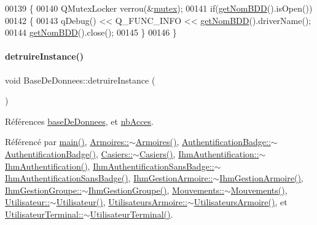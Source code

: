 \begin{DoxyCode}
00139 \{
00140     QMutexLocker verrou(&\hyperlink{class_base_de_donnees_aa1b4696fac87a740f914aa73739086f2}{mutex});
00141     \textcolor{keywordflow}{if}(\hyperlink{class_base_de_donnees_a467909531ae3cdebaf173f6e97cdc624}{getNomBDD}().isOpen())
00142     \{
00143         qDebug() << Q\_FUNC\_INFO << \hyperlink{class_base_de_donnees_a467909531ae3cdebaf173f6e97cdc624}{getNomBDD}().driverName();
00144         \hyperlink{class_base_de_donnees_a467909531ae3cdebaf173f6e97cdc624}{getNomBDD}().close();
00145     \}
00146 \}
\end{DoxyCode}
\mbox{\label{class_base_de_donnees_a457401c0816b888c77ce915997545f4e}} 
\paragraph{\texorpdfstring{detruire\+Instance()}{detruireInstance()}\hspace{0.1cm}{\footnotesize\ttfamily [1/2]}}
{\footnotesize\ttfamily void Base\+De\+Donnees\+::detruire\+Instance (\begin{DoxyParamCaption}{ }\end{DoxyParamCaption})\hspace{0.3cm}{\ttfamily [static]}}



Références \hyperlink{class_base_de_donnees_a218c44b630523435e2f6f8f2f0c484f8}{base\+De\+Donnees}, et \hyperlink{class_base_de_donnees_a5d2e5264c826c6600fd20a9831fd1782}{nb\+Acces}.



Référencé par \hyperlink{terminalmobile_2main_8cpp_a0ddf1224851353fc92bfbff6f499fa97}{main()}, \hyperlink{class_armoires_ae486320e819485eb011bb952aced3de2}{Armoires\+::$\sim$\+Armoires()}, \hyperlink{class_authentification_badge_a636b585e4c7f37ae77bf2fd66c0b01e1}{Authentification\+Badge\+::$\sim$\+Authentification\+Badge()}, \hyperlink{class_casiers_a12018a7daf2c2ce7652ccedbefc545cc}{Casiers\+::$\sim$\+Casiers()}, \hyperlink{class_ihm_authentification_aa48bdda8dd131164c79ae4cc8b350320}{Ihm\+Authentification\+::$\sim$\+Ihm\+Authentification()}, \hyperlink{class_ihm_authentification_sans_badge_a39197686724a0ad151c0c998301c198e}{Ihm\+Authentification\+Sans\+Badge\+::$\sim$\+Ihm\+Authentification\+Sans\+Badge()}, \hyperlink{class_ihm_gestion_armoire_a6d854653399972a013f79edfe32b04cb}{Ihm\+Gestion\+Armoire\+::$\sim$\+Ihm\+Gestion\+Armoire()}, \hyperlink{class_ihm_gestion_groupe_aba32d8b8ea5b7d31232d41ae051ebcb7}{Ihm\+Gestion\+Groupe\+::$\sim$\+Ihm\+Gestion\+Groupe()}, \hyperlink{class_mouvements_a89683efbe6894fe23d05c0a7bd6e5d23}{Mouvements\+::$\sim$\+Mouvements()}, \hyperlink{class_utilisateur_a6631539ceecd6140fe525eb91485537b}{Utilisateur\+::$\sim$\+Utilisateur()}, \hyperlink{class_utilisateurs_armoire_a980367259be2684f8f0762ea80deb9d9}{Utilisateurs\+Armoire\+::$\sim$\+Utilisateurs\+Armoire()}, et \hyperlink{class_utilisateur_terminal_a4042df79027924a5dd0181756687b89b}{Utilisateur\+Terminal\+::$\sim$\+Utilisateur\+Terminal()}.


